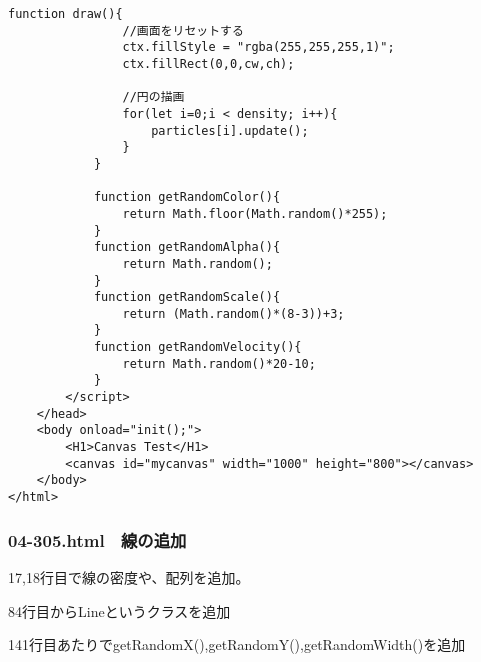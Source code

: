 \documentclass[mingoth,11pt,a4j,uplatex]{jsarticle}
\begin{document}
\begin{lstlisting}[caption=とある点からの吹き出し]
			function draw(){
				//画面をリセットする
				ctx.fillStyle = "rgba(255,255,255,1)";
				ctx.fillRect(0,0,cw,ch);
				
				//円の描画
				for(let i=0;i < density; i++){
					particles[i].update();
				}
			}

			function getRandomColor(){
				return Math.floor(Math.random()*255);
			}
			function getRandomAlpha(){
				return Math.random();
			}
			function getRandomScale(){
				return (Math.random()*(8-3))+3;
			}
			function getRandomVelocity(){
				return Math.random()*20-10;
			}
		</script>
	</head>
	<body onload="init();">
		<H1>Canvas Test</H1>
		<canvas id="mycanvas" width="1000" height="800"></canvas>
	</body>
</html>
\end{lstlisting}

\subsubsection{04-305.html　線の追加}
17,18行目で線の密度や、配列を追加。

84行目からLineというクラスを追加

141行目あたりでgetRandomX(),getRandomY(),getRandomWidth()を追加
\end{document}
